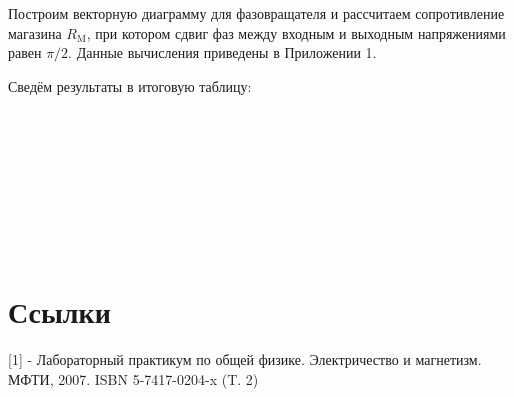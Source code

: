 Построим векторную диаграмму для фазовращателя и рассчитаем сопротивление магазина $R_{\text{M}}$, при котором сдвиг фаз между входным и выходным напряжениями равен $\pi/2$. Данные вычисления приведены в Приложении 1.

Сведём результаты в итоговую таблицу:\\
\\
\\
\\
\\
\\
\\
\\
\\
\section{\label{sec:level1}Ссылки}
[1] - Лабораторный практикум по общей физике. Электричество и магнетизм. МФТИ, 2007. ISBN 5-7417-0204-x (T. 2)
